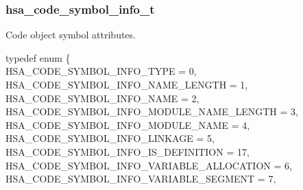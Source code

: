 \documentclass[final,oneside]{book}
\newcommand{\reftyp}[1]{#1}
\newcommand{\refenu}[1]{\reftyp{#1}}
\newenvironment{mylongtable}{\rowcolors{0}{lightgray}{lightgray}\longtable} {
\endlongtable}
\begin{document}
\subsubsection{hsa_\-code_\-symbol_\-info_\-t}
\vspace{-2.5mm}Code object symbol attributes.\begin{mylongtable}{@{}p{\textwidth}}
\rule{0pt}{3ex}typedef enum \{\\\hspace{1.7em}\hypertarget{group__code-object_1ggaded99609f1225ba3ed62328c7e1a3694a7432ef4a30aeccf408aa257496dbf354}{\refenu{HSA_\-CODE_\-SYMBOL_\-INFO_\-TYPE}} = 0,\\
\hspace{1.7em}\hypertarget{group__code-object_1ggaded99609f1225ba3ed62328c7e1a3694ab3a5d43c03060f1d1118f00f88f63885}{\refenu{HSA_\-CODE_\-SYMBOL_\-INFO_\-NAME_\-LENGTH}} = 1,\\
\hspace{1.7em}\hypertarget{group__code-object_1ggaded99609f1225ba3ed62328c7e1a3694a4c59e37218060708503434ca2af6df5b}{\refenu{HSA_\-CODE_\-SYMBOL_\-INFO_\-NAME}} = 2,\\
\hspace{1.7em}\hypertarget{group__code-object_1ggaded99609f1225ba3ed62328c7e1a3694a19a4d6ab4dd53d51ad8dca20dcaaae2a}{\refenu{HSA_\-CODE_\-SYMBOL_\-INFO_\-MODULE_\-NAME_\-LENGTH}} = 3,\\
\hspace{1.7em}\hypertarget{group__code-object_1ggaded99609f1225ba3ed62328c7e1a3694acdeacc2d88de153507b157df850c8d34}{\refenu{HSA_\-CODE_\-SYMBOL_\-INFO_\-MODULE_\-NAME}} = 4,\\
\hspace{1.7em}\hypertarget{group__code-object_1ggaded99609f1225ba3ed62328c7e1a3694a31bf12114328b85aff24960b2144eb54}{\refenu{HSA_\-CODE_\-SYMBOL_\-INFO_\-LINKAGE}} = 5,\\
\hspace{1.7em}\hypertarget{group__code-object_1ggaded99609f1225ba3ed62328c7e1a3694ae6cc27d2cdc6631174d15504e734186d}{\refenu{HSA_\-CODE_\-SYMBOL_\-INFO_\-IS_\-DEFINITION}} = 17,\\
\hspace{1.7em}\hypertarget{group__code-object_1ggaded99609f1225ba3ed62328c7e1a3694a22d4c6af18edc21289971543ac0cc217}{\refenu{HSA_\-CODE_\-SYMBOL_\-INFO_\-VARIABLE_\-ALLOCATION}} = 6,\\
\hspace{1.7em}\hypertarget{group__code-object_1ggaded99609f1225ba3ed62328c7e1a3694abb7e00d771642a81b50bf124d48c958b}{\refenu{HSA_\-CODE_\-SYMBOL_\-INFO_\-VARIABLE_\-SEGMENT}} = 7,\\

\end{mylongtable}
\end{document}
